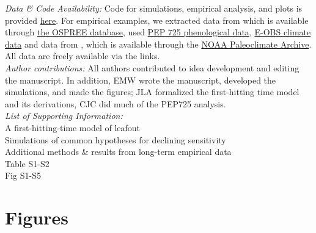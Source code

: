 \documentclass[11pt,letter]{article}
\begin{document}
\emph{Data \& Code Availability:} Code for simulations, empirical analysis, and plots is provided \href{https://github.com/temporalecologylab/labgit/tree/master/projects/decsenspost}{here}. For empirical examples, we extracted data from \citet{Charrier:2011aa} which is available through \href{https://knb.ecoinformatics.org}{the OSPREE database}, used \href{http://www.pep725.eu/data.php}{PEP 725 phenological data}, \href{https://surfobs.climate.copernicus.eu/dataaccess/access_eobs.php}{E-OBS climate data} and data from \citet{cookwine2016}, which is available through the \href{https://www.ncdc.noaa.gov/data-access/paleoclimatology-data/datasets}{NOAA Paleoclimate Archive}. All data are freely available via the links.\\

\emph{Author contributions:} All authors contributed to idea development and editing the manuscript. In addition, EMW wrote the manuscript, developed the simulations, and made the figures; JLA formalized the first-hitting time model and its derivations, CJC did much of the PEP725 analysis.\\

\emph{List of Supporting Information:}\\
A first-hitting-time model of leafout\\
Simulations of common hypotheses for declining sensitivity\\
Additional methods \& results from long-term empirical data\\
Table S1-S2\\
Fig S1-S5\\

\newpage
\section* {Figures}
\end{document}

